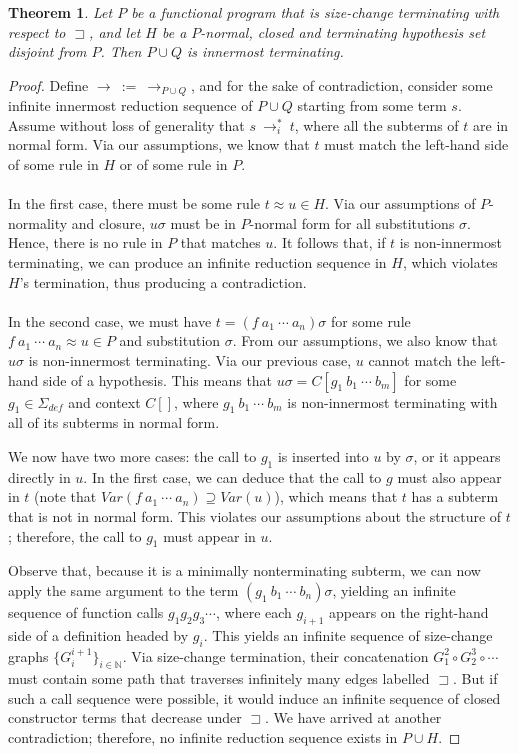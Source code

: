\documentclass{article}
\newtheorem{theorem}{Theorem}%
\theoremstyle{definition}
\newcommand{\supterm}{\sqsupset}
\begin{document}
\begin{theorem}
    Let $P$ be a functional program that is size-change terminating with respect to $\supterm$, and let $H$ be a $P$-normal, closed and terminating hypothesis set disjoint from $P$. Then $P \cup Q$ is innermost terminating. 
\end{theorem}
\begin{proof}
    Define $\longrightarrow ~:=~ \longrightarrow_{P \cup Q}$, and for the sake of contradiction, consider some infinite innermost reduction sequence of $P \cup Q$ starting from some term $s$. Assume without loss of generality that $s ~ \longrightarrow^*_i ~ t$, where all the subterms of $t$ are in normal form. Via our assumptions, we know that $t$ must match the left-hand side of some rule in $H$ or of some rule in $P$.
    \\~\\
    In the first case, there must be some rule $t \approx u \in H$. Via our assumptions of $P$-normality and closure, $u\sigma$ must be in $P$-normal form for all substitutions $\sigma$. Hence, there is no rule in $P$ that matches $u$. It follows that, if $t$ is non-innermost terminating, we can produce an infinite reduction sequence in $H$, which violates $H$'s termination, thus producing a contradiction.
    \\~\\
    In the second case, we must have $t = (f ~ a_1 ~ \cdots ~ a_n)\sigma$ for some rule $f ~ a_1 ~ \cdots ~ a_n \approx u \in P$ and substitution $\sigma$. From our assumptions, we also know that $u\sigma$ is non-innermost terminating. Via our previous case, $u$ cannot match the left-hand side of a hypothesis. This means that $u\sigma = C[g_1 ~ b_1 ~ \cdots ~ b_m]$ for some $g_1 \in \Sigma_{def}$ and context $C[]$, where $g_1 ~ b_1 ~ \cdots ~ b_m$ is non-innermost terminating with all of its subterms in normal form. 
    
    We now have two more cases: the call to $g_1$ is inserted into $u$ by $\sigma$, or it appears directly in $u$. In the first case, we can deduce that the call to $g$ must also appear in $t$ (note that $Var(f ~ a_1 ~ \cdots ~ a_n) \supseteq Var(u)$), which means that $t$ has a subterm that is not in normal form. This violates our assumptions about the structure of $t$; therefore, the call to $g_1$ must appear in $u$.

    Observe that, because it is a minimally nonterminating subterm, we can now apply the same argument to the term $(g_1 ~ b_1 ~ \cdots ~ b_n)\sigma$, yielding an infinite sequence of function calls $g_1 g_2 g_3 \cdots$, where each $g_{i+1}$ appears on the right-hand side of a definition headed by $g_i$. This yields an infinite sequence of size-change graphs $\{G_i^{i+1}\}_{i \in \mathbb{N}}$. Via size-change termination, their concatenation $G_1^2 \circ G_2^3 \circ \cdots$ must contain some path that traverses infinitely many edges labelled $\supterm$. But if such a call sequence were possible, it would induce an infinite sequence of closed constructor terms that decrease under $\supterm$. We have arrived at another contradiction; therefore, no infinite reduction sequence exists in $P \cup H$.
\end{proof}
\end{document}
